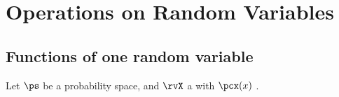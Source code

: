 \chapter{Operations on Random Variables}
\label{chp:rval}

\section{Functions of one random variable}
\begin{proposition}
\label{prop:cdf_uniform}
Let $\ps$ be a probability space, and $\rvX$ a 
with  $\pcx(x)$ .
\end{proposition}


